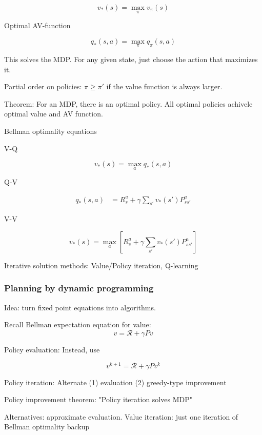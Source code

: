 \documentclass[english]{article}
\begin{document}
$$v_*(s) = \max_\pi v_\pi(s)$$

Optimal AV-function

$$q_*(s,a) = \max_\pi q_\pi(s,a)$$

This solves the MDP. For any given state, just choose the action that maximizes it.

Partial order on policies: $\pi \ge \pi'$ if the value function is always larger.

Theorem: For an MDP, there is an optimal policy. All optimal policies achivele optimal value and AV function.

\item Bellman optimality equations


V-Q

$$v_*(s) = \max_{a} q_*(s,a)$$

Q-V

\begin{align*}
q_*(s,a) &= R_s^a +\gamma 
\sum_{s'} v_*(s')P_{ss'}^a
\end{align*}

V-V

$$v_*(s) 
= \max_{a} 
[R_s^a +\gamma 
\sum_{s'} v_*(s')P_{ss'}^a]$$

\item Iterative solution methods: Value/Policy iteration, Q-learning




\eenum


\subsubsection{Planning by dynamic programming}
\benum

\item Idea: turn fixed point equations into algorithms.

\item Recall Bellman expectation equation for value: 
$$
v = \mathcal{R} + \gamma Pv
$$

Policy evaluation: Instead, use 

$$
v^{k+1} = \mathcal{R} + \gamma Pv^{k}
$$

\item Policy iteration: Alternate (1) evaluation (2) greedy-type improvement

\item Policy improvement theorem: "Policy iteration solves MDP"

\item Alternatives: approximate evaluation. Value iteration: just one iteration of Bellman optimality backup
\end{document}
